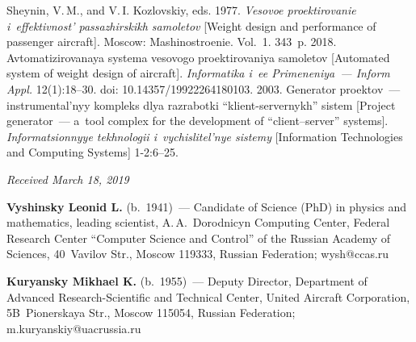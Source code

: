   \begin{multicols}{2}

\renewcommand{\bibname}{\protect\rmfamily References}

{\small\frenchspacing
 {%
 \begin{thebibliography}{9}
Sheynin, V.\,M., and V.\,I. Kozlovskiy, eds. 1977. \textit{Vesovoe proektirovanie 
i~effektivnost' passazhirskikh samoletov} [Weight design and performance of 
passenger aircraft]. Moscow: Mashinostroenie. Vol.~1. 343~p.
 2018. 
Avtomatizirovanaya systema vesovogo proektirovaniya samoletov [Automated 
system of weight design of aircraft]. \textit{Informatika i~ee Primeneniya~--- Inform 
Appl.} 12(1):18--30. doi: 10.14357/19922264180103.
 2003. Generator proektov~--- instrumental'nyy kompleks dlya 
razrabotki ``klient-servernykh'' sistem [Project generator~--- a~tool complex for the 
development of ``client--server'' systems]. \textit{Informatsionnyye tekhnologii 
i~vychislitel'nye sistemy} [Information Technologies and Computing Systems] 
1-2:6--25.
\end{thebibliography}

 }
 }

\end{multicols}

\vspace*{-7pt}

\hfill{\small\textit{Received March 18, 2019}}


\vspace*{-24pt}

\Contr

\vspace*{-2pt}

\noindent
\textbf{Vyshinsky Leonid L.} (b.\ 1941)~--- Candidate of Science (PhD) in 
physics and mathematics, leading scientist, A.\,A.~Dorodnicyn Computing 
Center, Federal Research Center ``Computer Science and Control'' of the Russian 
Academy of Sciences, 40~Vavilov Str., Moscow 119333, Russian Federation; 
\mbox{wysh@ccas.ru}


\noindent
  \textbf{Kuryansky Mikhael K.}  (b.\ 1955)~--- Deputy Director, Department of 
Advanced Research-Scientific and Technical Center, United Aircraft Corporation, 
5B~Pionerskaya Str., Moscow 115054, Russian Federation; 
\mbox{m.kuryanskiy@uacrussia.ru}

